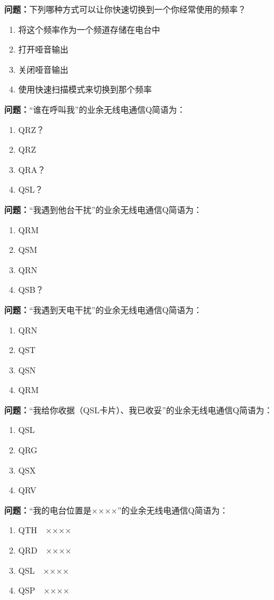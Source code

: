 \documentclass[UTF8]{ctexbook}
\begin{document}
\textbf{问题：}下列哪种方式可以让你快速切换到一个你经常使用的频率？
\begin{enumerate}[label=\Alph*), leftmargin=3em]
  \item 将这个频率作为一个频道存储在电台中
  \item 打开哑音输出
  \item 关闭哑音输出
  \item 使用快速扫描模式来切换到那个频率
\end{enumerate}

\textbf{问题：}“谁在呼叫我”的业余无线电通信Q简语为：
\begin{enumerate}[label=\Alph*), leftmargin=3em]
  \item QRZ？
  \item QRZ
  \item QRA？
  \item QSL？
\end{enumerate}

\textbf{问题：}“我遇到他台干扰”的业余无线电通信Q简语为：
\begin{enumerate}[label=\Alph*), leftmargin=3em]
  \item QRM
  \item QSM
  \item QRN
  \item QSB？
\end{enumerate}

\textbf{问题：}“我遇到天电干扰”的业余无线电通信Q简语为：
\begin{enumerate}[label=\Alph*), leftmargin=3em]
  \item QRN
  \item QST
  \item QSN
  \item QRM
\end{enumerate}

\textbf{问题：}“我给你收据（QSL卡片）、我已收妥”的业余无线电通信Q简语为：
\begin{enumerate}[label=\Alph*), leftmargin=3em]
  \item QSL
  \item QRG
  \item QSX
  \item QRV
\end{enumerate}

\textbf{问题：}“我的电台位置是××××”的业余无线电通信Q简语为：
\begin{enumerate}[label=\Alph*), leftmargin=3em]
  \item QTH　××××
  \item QRD　××××
  \item QSL　××××
  \item QSP　××××
\end{enumerate}
\end{document}
